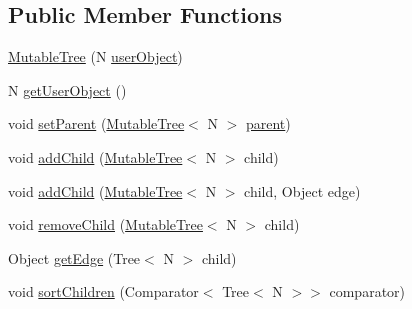 \subsection*{Public Member Functions}
\begin{DoxyCompactItemize}
\item 
\hyperlink{classuk_1_1ac_1_1manchester_1_1cs_1_1bhig_1_1util_1_1_mutable_tree_3_01_n_01_4_aa66d9d4e5367d2cd6d3f31a9700c8ffe}{Mutable\-Tree} (N \hyperlink{classuk_1_1ac_1_1manchester_1_1cs_1_1bhig_1_1util_1_1_mutable_tree_3_01_n_01_4_aa8480fa5683b8058231a055ed85901c5}{user\-Object})
\item 
N \hyperlink{classuk_1_1ac_1_1manchester_1_1cs_1_1bhig_1_1util_1_1_mutable_tree_3_01_n_01_4_a4d77d162dda0f1d5e315e4414e8bd4ea}{get\-User\-Object} ()
\item 
void \hyperlink{classuk_1_1ac_1_1manchester_1_1cs_1_1bhig_1_1util_1_1_mutable_tree_3_01_n_01_4_ae2c105d2cdb92d2cc4d4dc0adb9a1f48}{set\-Parent} (\hyperlink{classuk_1_1ac_1_1manchester_1_1cs_1_1bhig_1_1util_1_1_mutable_tree_3_01_n_01_4_aa66d9d4e5367d2cd6d3f31a9700c8ffe}{Mutable\-Tree}$<$ N $>$ \hyperlink{classuk_1_1ac_1_1manchester_1_1cs_1_1bhig_1_1util_1_1_mutable_tree_3_01_n_01_4_a822690317c83aec9e5db7028f172ce1a}{parent})
\item 
void \hyperlink{classuk_1_1ac_1_1manchester_1_1cs_1_1bhig_1_1util_1_1_mutable_tree_3_01_n_01_4_a1048db866b21e4179fa225ce83ea586d}{add\-Child} (\hyperlink{classuk_1_1ac_1_1manchester_1_1cs_1_1bhig_1_1util_1_1_mutable_tree_3_01_n_01_4_aa66d9d4e5367d2cd6d3f31a9700c8ffe}{Mutable\-Tree}$<$ N $>$ child)
\item 
void \hyperlink{classuk_1_1ac_1_1manchester_1_1cs_1_1bhig_1_1util_1_1_mutable_tree_3_01_n_01_4_af0fc491fe787b3fa75a73121e7058b91}{add\-Child} (\hyperlink{classuk_1_1ac_1_1manchester_1_1cs_1_1bhig_1_1util_1_1_mutable_tree_3_01_n_01_4_aa66d9d4e5367d2cd6d3f31a9700c8ffe}{Mutable\-Tree}$<$ N $>$ child, Object edge)
\item 
void \hyperlink{classuk_1_1ac_1_1manchester_1_1cs_1_1bhig_1_1util_1_1_mutable_tree_3_01_n_01_4_a7c60738ae59f50d95a99ca9d147531c8}{remove\-Child} (\hyperlink{classuk_1_1ac_1_1manchester_1_1cs_1_1bhig_1_1util_1_1_mutable_tree_3_01_n_01_4_aa66d9d4e5367d2cd6d3f31a9700c8ffe}{Mutable\-Tree}$<$ N $>$ child)
\item 
Object \hyperlink{classuk_1_1ac_1_1manchester_1_1cs_1_1bhig_1_1util_1_1_mutable_tree_3_01_n_01_4_abeccd2798524d875c42c468ecf80bf4b}{get\-Edge} (Tree$<$ N $>$ child)
\item 
void \hyperlink{classuk_1_1ac_1_1manchester_1_1cs_1_1bhig_1_1util_1_1_mutable_tree_3_01_n_01_4_a5919d9c72ea1a604d8e3099a712fdd48}{sort\-Children} (Comparator$<$ Tree$<$ N $>$$>$ comparator)
$$
\end{DoxyCompactItemize}
